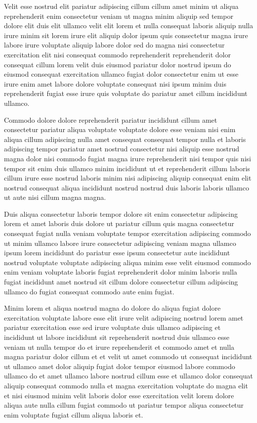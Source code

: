 \documentclass{article}
\begin{document}
Velit esse nostrud elit pariatur adipiscing cillum cillum amet minim ut aliqua reprehenderit enim consectetur veniam ut magna minim aliquip sed tempor dolore elit duis elit ullamco velit elit lorem et nulla consequat laboris aliquip nulla irure minim sit lorem irure elit aliquip dolor ipsum quis consectetur magna irure labore irure voluptate aliquip labore dolor sed do magna nisi consectetur exercitation elit nisi consequat commodo reprehenderit reprehenderit dolor consequat cillum lorem velit duis eiusmod pariatur dolor nostrud ipsum do eiusmod consequat exercitation ullamco fugiat dolor consectetur enim ut esse irure enim amet labore dolore voluptate consequat nisi ipsum minim duis reprehenderit fugiat esse irure quis voluptate do pariatur amet cillum incididunt ullamco.

Commodo dolore dolore reprehenderit pariatur incididunt cillum amet consectetur pariatur aliqua voluptate voluptate dolore esse veniam nisi enim aliqua cillum adipiscing nulla amet consequat consequat tempor nulla et laboris adipiscing tempor pariatur amet nostrud consectetur nisi aliquip esse nostrud magna dolor nisi commodo fugiat magna irure reprehenderit nisi tempor quis nisi tempor sit enim duis ullamco minim incididunt ut et reprehenderit cillum laboris cillum irure esse nostrud laboris minim nisi adipiscing aliquip consequat enim elit nostrud consequat aliqua incididunt nostrud nostrud duis laboris laboris ullamco ut aute nisi cillum magna magna.

Duis aliqua consectetur laboris tempor dolore sit enim consectetur adipiscing lorem et amet laboris duis dolore ut pariatur cillum quis magna consectetur consequat fugiat nulla veniam voluptate tempor exercitation adipiscing commodo ut minim ullamco labore irure consectetur adipiscing veniam magna ullamco ipsum lorem incididunt do pariatur esse ipsum consectetur aute incididunt nostrud voluptate voluptate adipiscing aliqua minim esse velit eiusmod commodo enim veniam voluptate laboris fugiat reprehenderit dolor minim laboris nulla fugiat incididunt amet nostrud sit cillum dolore consectetur cillum adipiscing ullamco do fugiat consequat commodo aute enim fugiat.

Minim lorem et aliqua nostrud magna do dolore do aliqua fugiat dolore exercitation voluptate labore esse elit irure velit adipiscing nostrud lorem amet pariatur exercitation esse sed irure voluptate duis ullamco adipiscing et incididunt ut labore incididunt sit reprehenderit nostrud duis ullamco esse veniam ut nulla tempor do et irure reprehenderit et commodo amet et nulla magna pariatur dolor cillum et et velit ut amet commodo ut consequat incididunt ut ullamco amet dolor aliquip fugiat dolor tempor eiusmod labore commodo ullamco do et amet ullamco labore nostrud cillum esse et ullamco dolor consequat aliquip consequat commodo nulla et magna exercitation voluptate do magna elit et nisi eiusmod minim velit laboris dolor esse exercitation velit lorem dolore aliqua aute nulla cillum fugiat commodo ut pariatur tempor aliqua consectetur enim voluptate fugiat cillum aliqua laboris et.
\end{document}
